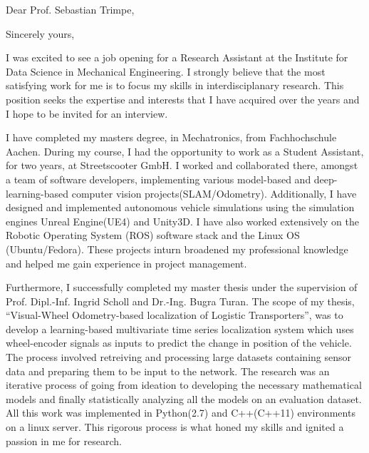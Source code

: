 \documentclass[11pt,a4paper,roman]{moderncv} %
\begin{document}


\clearpage

\date{\today} %
\opening{Dear Prof. Sebastian Trimpe,} %
\closing{Sincerely yours,} %

\makelettertitle %

\justify
 
I was excited to see a job opening for a Research Assistant at the Institute for Data Science in Mechanical Engineering.
I strongly believe that the most satisfying work for me is to focus my skills in interdisciplanary research.
This position seeks the expertise and interests that I have acquired over the years and I hope to be 
invited for an interview.

I have completed my masters degree, in Mechatronics, from Fachhochschule Aachen. During my course, 
I had the opportunity to work as a Student Assistant, for two years, 
at Streetscooter GmbH. I worked and collaborated there, amongst a team of software developers, implementing 
various model-based and deep-learning-based computer vision projects(SLAM/Odometry). 
Additionally, I have designed and implemented autonomous vehicle simulations using 
the simulation engines Unreal Engine(UE4) and Unity3D. I have also worked extensively on the Robotic Operating System (ROS) 
software stack and the Linux OS (Ubuntu/Fedora). These projects inturn broadened my professional knowledge and helped me 
gain experience in project management.

Furthermore, I successfully completed my master thesis under the supervision of 
Prof. Dipl.-Inf. Ingrid Scholl and Dr.-Ing. Bugra Turan. The scope of my thesis, 
``Visual-Wheel Odometry-based localization of Logistic Transporters'', was to 
develop a learning-based multivariate time series localization system which uses wheel-encoder 
signals as inputs to predict the change in position of the vehicle.
The process involved retreiving and processing large datasets containing sensor data 
and preparing them to be input to the network. The research was an iterative process 
of going from ideation to developing the necessary mathematical models and finally 
statistically analyzing all the models on an evaluation dataset.
All this work was implemented in Python(2.7) and C++(C++11) environments on a 
linux server. This rigorous process is what honed my skills and ignited a 
passion in me for research.
\end{document}
